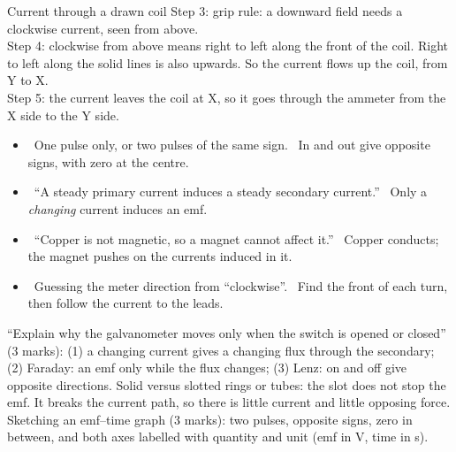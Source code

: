 \begin{workedexample}{Current through a drawn coil}
{  Step 3: grip rule: a downward field needs a clockwise current, seen from above.\\
  Step 4: clockwise from above means right to left along the front of the coil.
  Right to left along the solid lines is also upwards. So the current flows up
  the coil, from Y to X.\\
  Step 5: the current leaves the coil at X, so it goes through the ammeter from
  the X side to the Y side.}
\end{workedexample}

\begin{mistakes}
\begin{itemize}
  \item \xmark\ One pulse only, or two pulses of the same sign. \cmark\ In and out
        give opposite signs, with zero at the centre.
  \item \xmark\ ``A steady primary current induces a steady secondary current.''
        \cmark\ Only a \emph{changing} current induces an emf.
  \item \xmark\ ``Copper is not magnetic, so a magnet cannot affect it.''
        \cmark\ Copper conducts; the magnet pushes on the currents induced in it.
  \item \xmark\ Guessing the meter direction from ``clockwise''. \cmark\ Find the
        front of each turn, then follow the current to the leads.
\end{itemize}
\end{mistakes}

\begin{examtip}
``Explain why the galvanometer moves only when the switch is opened or closed''
(3 marks): (1) a changing current gives a changing flux through the secondary;
(2) Faraday: an emf only while the flux changes; (3) Lenz: on and off give
opposite directions. Solid versus slotted rings or tubes: the slot does not stop
the emf. It breaks the current path, so there is little current and little
opposing force. Sketching an emf--time graph (3 marks): two pulses, opposite
signs, zero in between, and both axes labelled with quantity and unit (emf in
\si{V}, time in \si{s}).
\end{examtip}

